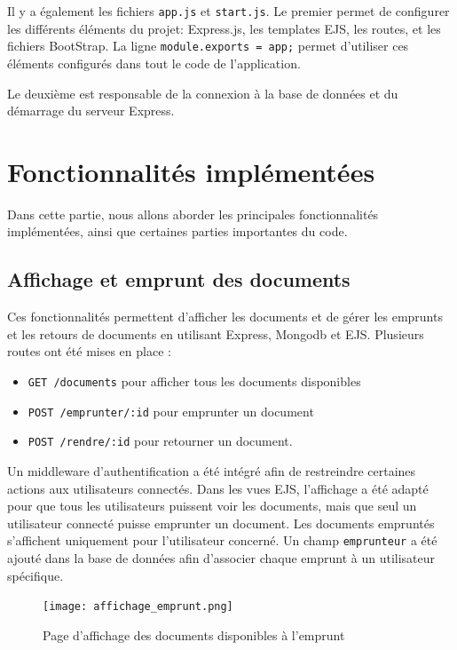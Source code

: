 \documentclass[12pt,a4paper]{article}
\begin{document}
Il y a également les fichiers \texttt{app.js} et \texttt{start.js}. Le premier permet de configurer les différents éléments du projet: Express.js, les templates EJS, les routes, et les fichiers BootStrap. La ligne \texttt{module.exports = app;} permet d'utiliser ces éléments configurés dans tout le code de l'application.

Le deuxième est responsable de la connexion à la base de données et du démarrage du serveur Express.

			
\newpage

\section{Fonctionnalités implémentées}

Dans cette partie, nous allons aborder les principales fonctionnalités implémentées, ainsi que certaines parties importantes du code.

\subsection{Affichage et emprunt des documents}

Ces fonctionnalités permettent d'afficher les documents et de gérer les emprunts et les retours de documents en utilisant Express, Mongodb et EJS. Plusieurs routes ont été mises en place :  \\

\begin{itemize}
	\item \texttt{GET /documents} pour afficher tous les documents disponibles 
	\item \texttt{POST /emprunter/:id} pour emprunter un document 
	\item \texttt{POST /rendre/:id} pour retourner un document. \\
\end{itemize} 

 Un middleware d'authentification a été intégré afin de restreindre certaines actions aux utilisateurs connectés.
Dans les vues EJS, l'affichage a été adapté pour que tous les utilisateurs puissent voir les documents, mais que seul un utilisateur connecté puisse emprunter un document. Les documents empruntés s'affichent uniquement pour l'utilisateur concerné. Un champ \texttt{emprunteur} a été ajouté dans la base de données afin d’associer chaque emprunt à un utilisateur spécifique.

\begin{figure}[!h]
	\begin{center}
		\texttt{[image: affichage\_emprunt.png]}
		\caption{Page d'affichage des documents disponibles à l'emprunt} 
	\end{center}
\end{figure}
\end{document}
